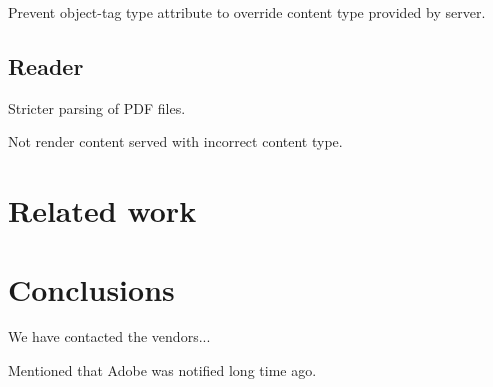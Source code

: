 \documentclass[10pt, conference, compsocconf]{IEEEtran}
\begin{document}
Prevent object-tag type attribute to override content type 
provided by server. 


\subsection{Reader}

Stricter parsing of PDF files.

Not render content served with incorrect content type.








\section{Related work}







\section{Conclusions}


We have contacted the vendors...

Mentioned that Adobe was notified long time ago.







\end{document}
